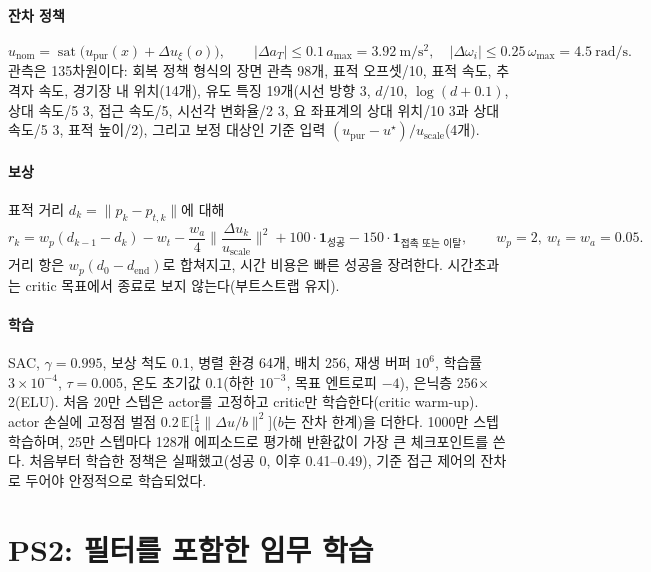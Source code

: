 \documentclass[10pt,a4paper]{article}
\newcommand{\sat}{\operatorname{sat}}
\newcommand{\unom}{u_{\mathrm{nom}}}
\newcommand{\upur}{u_{\mathrm{pur}}}
\newcommand{\ustar}{u^{\star}}
\begin{document}
\paragraph{잔차 정책}
\begin{equation}
\unom=\sat\big(\upur(x)+\Delta u_\xi(o)\big),\qquad |\Delta a_T|\le0.1\,a_{\max}=3.92\ \mathrm{m/s^2},\quad |\Delta\omega_i|\le0.25\,\omega_{\max}=4.5\ \mathrm{rad/s}.
\label{eq:residual}
\end{equation}
관측은 135차원이다: 회복 정책 형식의 장면 관측 98개, 표적 오프셋/10, 표적 속도, 추격자 속도, 경기장 내 위치(14개),
유도 특징 19개(시선 방향 3, $d/10$, $\log(d+0.1)$, 상대 속도/5 3, 접근 속도/5, 시선각 변화율/2 3, 요 좌표계의 상대 위치/10 3과 상대 속도/5 3, 표적 높이/2),
그리고 보정 대상인 기준 입력 $(\upur-\ustar)/u_{\mathrm{scale}}$(4개).

\paragraph{보상} 표적 거리 $d_k=\|p_k-p_{t,k}\|$에 대해
\begin{equation}
r_k=w_p(d_{k-1}-d_k)-w_t-\frac{w_a}{4}\Big\|\frac{\Delta u_k}{u_{\mathrm{scale}}}\Big\|^2+100\cdot\mathbf 1_{\text{성공}}-150\cdot\mathbf 1_{\text{접촉 또는 이탈}},\qquad w_p=2,\ w_t=w_a=0.05 .
\label{eq:reward}
\end{equation}
거리 항은 $w_p(d_0-d_{\mathrm{end}})$로 합쳐지고, 시간 비용은 빠른 성공을 장려한다. 시간초과는 critic 목표에서 종료로 보지 않는다(부트스트랩 유지).

\paragraph{학습} SAC, $\gamma=0.995$, 보상 척도 0.1, 병렬 환경 64개, 배치 256, 재생 버퍼 $10^6$, 학습률 $3\times10^{-4}$, $\tau=0.005$, 온도 초기값 0.1(하한 $10^{-3}$, 목표 엔트로피 $-4$), 은닉층 256$\times$2(ELU).
처음 20만 스텝은 actor를 고정하고 critic만 학습한다(critic warm-up). actor 손실에 고정점 벌점 $0.2\,\mathbb E\big[\tfrac14\|\Delta u/b\|^2\big]$($b$는 잔차 한계)을 더한다.
1000만 스텝 학습하며, 25만 스텝마다 128개 에피소드로 평가해 반환값이 가장 큰 체크포인트를 쓴다. 처음부터 학습한 정책은 실패했고(성공 0, 이후 0.41--0.49), 기준 접근 제어의 잔차로 두어야 안정적으로 학습되었다.

\section{PS2: 필터를 포함한 임무 학습}\label{sec:ps2}
\end{document}
